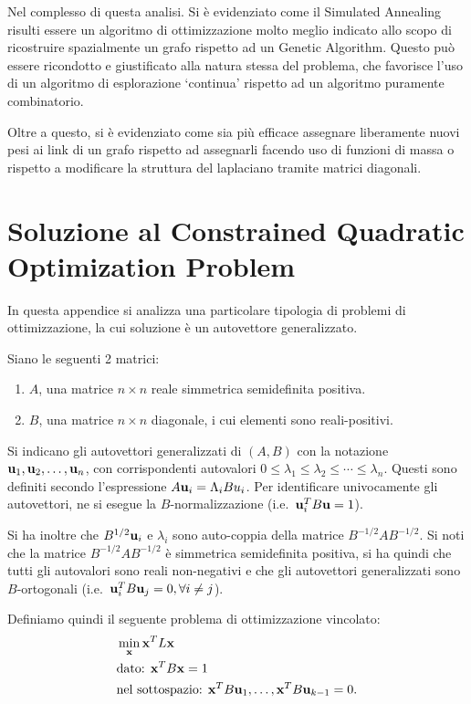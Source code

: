 \documentclass[10pt,a4paper]{article}
\begin{document}
Nel complesso di questa analisi. Si è evidenziato come il Simulated Annealing risulti essere un algoritmo di ottimizzazione molto meglio indicato allo scopo di ricostruire spazialmente un grafo rispetto ad un Genetic Algorithm.
Questo può essere ricondotto e giustificato alla natura stessa del problema, che favorisce l'uso di un algoritmo di esplorazione `continua' rispetto ad un algoritmo puramente combinatorio.

Oltre a questo, si è evidenziato come sia più efficace assegnare liberamente nuovi pesi ai link di un grafo rispetto ad assegnarli facendo uso di funzioni di massa o rispetto a modificare la struttura del laplaciano tramite matrici diagonali.

\appendix

\section{Soluzione al Constrained Quadratic Optimization Problem}\label{sec:soluzione_constrained}
In questa appendice si analizza una particolare tipologia di problemi di ottimizzazione, la cui soluzione è un autovettore generalizzato.

Siano le seguenti 2 matrici:
\begin{enumerate}
    \item \(A\), una matrice \(n \times n\) reale simmetrica semidefinita positiva.
    \item \(B\), una matrice \(n \times n\) diagonale, i cui elementi sono reali-positivi.
\end{enumerate}
Si indicano gli autovettori generalizzati di \((A,B)\) con la notazione \(\vb{u}_1,\vb{u}_2,\ldots,\vb{u}_n\), con corrispondenti autovalori \(0\leq\lambda_1\leq\lambda_2\leq\cdots\leq\lambda_n\).
Questi sono definiti secondo l'espressione \(A \vb{u}_i = \Lambda_i B u_i\).
Per identificare univocamente gli autovettori, ne si esegue la \(B\)-normalizzazione (i.e.\  \(\vb{u}_i^T B \vb{u}=1\)).

Si ha inoltre che \(B^{1/2}\vb{u}_i\) e \(\lambda_i\) sono auto-coppia della matrice \(B^{-1/2} A B^{-1/2}\).
Si noti che la matrice \(B^{-1/2} A B^{-1/2}\) è simmetrica semidefinita positiva, si ha quindi che tutti gli autovalori sono reali non-negativi e che gli autovettori generalizzati sono \(B\)-ortogonali (i.e.\  \(\vb{u}_i^T B \vb{u}_j = 0, \forall i \neq j\)).

Definiamo quindi il seguente problema di ottimizzazione vincolato:
\begin{align}
    & \min_{\vb{x}} \vb{x}^T L\vb{x} \label{eq:definition}\\
    & \text{dato: } \vb{x}^T B\vb{x} = 1 \\
    & \text{nel sottospazio: } \vb{x}^T B \vb{u}_1,\ldots, \vb{x}^T B \vb{u}_{k-1} = 0.
\end{align}
\end{document}
